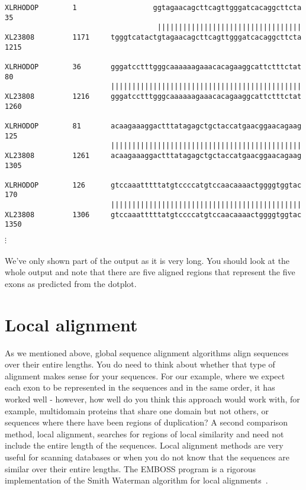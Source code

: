\documentclass[12pt]{report}
\begin{document}
\begin{verbatim}
XLRHODOP        1                  ggtagaacagcttcagttgggatcacaggcttcta 35      
                                    ||||||||||||||||||||||||||||||||||
XL23808         1171     tgggtcatactgtagaacagcttcagttgggatcacaggcttcta 1215    

XLRHODOP        36       gggatcctttgggcaaaaaagaaacacagaaggcattctttctat 80      
                         |||||||||||||||||||||||||||||||||||||||||||||
XL23808         1216     gggatcctttgggcaaaaaagaaacacagaaggcattctttctat 1260    

XLRHODOP        81       acaagaaaggactttatagagctgctaccatgaacggaacagaag 125     
                         |||||||||||||||||||||||||||||||||||||||||||||
XL23808         1261     acaagaaaggactttatagagctgctaccatgaacggaacagaag 1305    

XLRHODOP        126      gtccaaatttttatgtccccatgtccaacaaaactggggtggtac 170     
                         |||||||||||||||||||||||||||||||||||||||||||||
XL23808         1306     gtccaaatttttatgtccccatgtccaacaaaactggggtggtac 1350   \end{verbatim}
$\vdots$
\\
\\
\noindent We've only shown part of the output as it is very long. You should
look at the whole output and note that there are five aligned regions
that represent the five exons as predicted from the dotplot.

\section{Local alignment}
As we mentioned above, global sequence alignment algorithms align
sequences over their entire lengths. You do need to think about
whether that type of alignment makes sense for your sequences. For our
example, where we expect each exon to be represented in the sequences
and in the same order, it has worked well - however, how well do you
think this approach would work with, for example, multidomain proteins
that share one domain but not others, or sequences where there have
been regions of duplication? A second comparison method, local
alignment, searches for regions of local similarity and need not
include the entire length of the sequences. Local alignment methods
are very useful for scanning databases or when you do not know that
the sequences are similar over their entire lengths. The EMBOSS
program  is a rigorous implementation of the Smith Waterman
algorithm for local alignments~\cite{Smith:81}.
\end{document}
